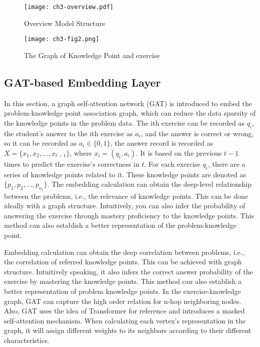 \begin{figure}[htbp!]
	\centering
	\texttt{[image: ch3-overview.pdf]}
	\caption{Overview Model Structure}\label{fig:ch3-fig1}
\end{figure}
\begin{figure}[htbp!]
	\centering
	\texttt{[image: ch3-fig2.png]}
	\caption{The Graph of Knowledge Point and exercise}\label{fig:ch3-fig2}
\end{figure}


\subsection{GAT-based Embedding Layer}

In this section, a graph self-attention network (GAT) is introduced to embed the problem-knowledge point association graph, which can reduce the data sparsity of the knowledge points in the problem data. The ith exercise can be recorded as \(q_i\), the student's answer to the ith exercise as \(a_i\), and the answer is correct or wrong, so it can be recorded as \(a_i\in \{0,1\} \), the answer record is recorded as \(X=\{x_1,x_2,\ldots,x_{t-1}\} \), where \(x_i=(q_i,a_i)\). It is based on the previous \(t-1\) times to predict the exercise's correctness in \(t\). For each exercise \(q_i\), there are a series of knowledge points related to it. These knowledge points are denoted as \( \{p_1,p_2,\ldots,p_{n_i}\} \). The embedding calculation can obtain the deep-level relationship between the problems, i.e., the relevance of knowledge points. This can be done ideally with a graph structure. Intuitively, you can also infer the probability of answering the exercise through mastery proficiency to the knowledge points. This method can also establish a better representation of the problem-knowledge point.

Embedding calculation can obtain the deep correlation between problems, i.e., the correlation of referred knowledge points. This can be achieved with graph structure. Intuitively speaking, it also infers the correct answer probability of the exercise by mastering the knowledge points. This method can also establish a better representation of problem knowledge points. In the exercise-knowledge graph, GAT can capture the high order relation for n-hop neighboring nodes. Also, GAT uses the idea of Transformer for reference and introduces a masked self-attention mechanism. When calculating each vertex's representation in the graph, it will assign different weights to its neighbors according to their different characteristics.

